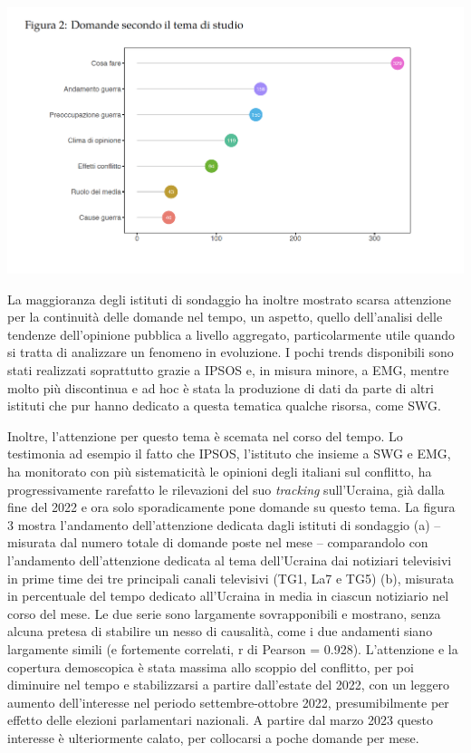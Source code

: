 \documentclass[
  openany]{book}
\begin{document}
\includegraphics{Images/Figura2.png}

La maggioranza degli istituti di sondaggio ha inoltre mostrato scarsa attenzione per
la continuità delle domande nel tempo, un aspetto, quello dell'analisi delle tendenze
dell'opinione pubblica a livello aggregato, particolarmente utile quando si tratta di
analizzare un fenomeno in evoluzione. I pochi trends disponibili sono stati realizzati
soprattutto grazie a IPSOS e, in misura minore, a EMG, mentre molto più discontinua
e ad hoc è stata la produzione di dati da parte di altri istituti che pur hanno dedicato a
questa tematica qualche risorsa, come SWG.

Inoltre, l'attenzione per questo tema è scemata nel corso del tempo. Lo testimonia ad
esempio il fatto che IPSOS, l'istituto che insieme a SWG e EMG, ha monitorato con più
sistematicità le opinioni degli italiani sul conflitto, ha progressivamente rarefatto le rilevazioni del suo \emph{tracking} sull'Ucraina, già dalla fine del 2022 e ora solo sporadicamente pone domande su questo tema. La figura 3 mostra l'andamento dell'attenzione dedicata dagli istituti di sondaggio (a) -- misurata dal numero totale di domande poste nel
mese -- comparandolo con l'andamento dell'attenzione dedicata al tema dell'Ucraina
dai notiziari televisivi in prime time dei tre principali canali televisivi (TG1, La7 e TG5) (b), misurata in percentuale del tempo dedicato all'Ucraina in media in ciascun notiziario nel corso del mese. Le due serie sono largamente sovrapponibili e mostrano, senza alcuna pretesa di stabilire un nesso di causalità, come i due andamenti siano largamente simili (e fortemente correlati, r di Pearson = 0.928). L'attenzione e la copertura demoscopica è stata massima allo scoppio del conflitto, per poi diminuire nel tempo e stabilizzarsi a partire dall'estate del 2022, con un leggero aumento dell'interesse nel periodo settembre-ottobre 2022, presumibilmente per effetto delle elezioni parlamentari
nazionali. A partire dal marzo 2023 questo interesse è ulteriormente calato, per collocarsi a poche domande per mese.
\end{document}
